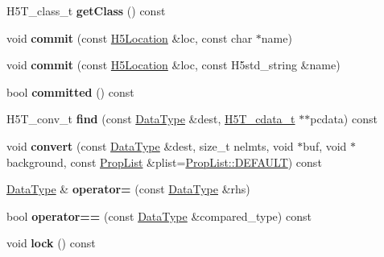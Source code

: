 \begin{DoxyCompactItemize}
H5\+T\+\_\+class\+\_\+t {\bfseries get\+Class} () const
\item 
\mbox{\label{class_h5_1_1_data_type_aadbd48b214b6466eed4488cdf9f3fc2b}} 
void {\bfseries commit} (const \hyperlink{class_h5_1_1_h5_location}{H5\+Location} \&loc, const char $\ast$name)
\item 
\mbox{\label{class_h5_1_1_data_type_ae1e48ebb34e35dc5e16febb0537fd09e}} 
void {\bfseries commit} (const \hyperlink{class_h5_1_1_h5_location}{H5\+Location} \&loc, const H5std\+\_\+string \&name)
\item 
\mbox{\label{class_h5_1_1_data_type_ae21e317b0e89e4b9dbbdce8724d104e6}} 
bool {\bfseries committed} () const
\item 
\mbox{\label{class_h5_1_1_data_type_abf94bf130bb03f12af17076625204862}} 
H5\+T\+\_\+conv\+\_\+t {\bfseries find} (const \hyperlink{class_h5_1_1_data_type}{Data\+Type} \&dest, \hyperlink{struct_h5_t__cdata__t}{H5\+T\+\_\+cdata\+\_\+t} $\ast$$\ast$pcdata) const
\item 
\mbox{\label{class_h5_1_1_data_type_a0355a699e3098144739a399d92e2079e}} 
void {\bfseries convert} (const \hyperlink{class_h5_1_1_data_type}{Data\+Type} \&dest, size\+\_\+t nelmts, void $\ast$buf, void $\ast$background, const \hyperlink{class_h5_1_1_prop_list}{Prop\+List} \&plist=\hyperlink{class_h5_1_1_prop_list_ae52af66ce82af0ea7e6dc57148c56241}{Prop\+List\+::\+D\+E\+F\+A\+U\+LT}) const
\item 
\mbox{\label{class_h5_1_1_data_type_a16a3ddb765d15d2a8ce00b7f965729a1}} 
\hyperlink{class_h5_1_1_data_type}{Data\+Type} \& {\bfseries operator=} (const \hyperlink{class_h5_1_1_data_type}{Data\+Type} \&rhs)
\item 
\mbox{\label{class_h5_1_1_data_type_a3b88adf3ae2b4cf7338040323b124121}} 
bool {\bfseries operator==} (const \hyperlink{class_h5_1_1_data_type}{Data\+Type} \&compared\+\_\+type) const
\item 
\mbox{\label{class_h5_1_1_data_type_a85bda5a09b55a49003c2bc6aaf8cb3d0}} 
void {\bfseries lock} () const
$$
\end{DoxyCompactItemize}
